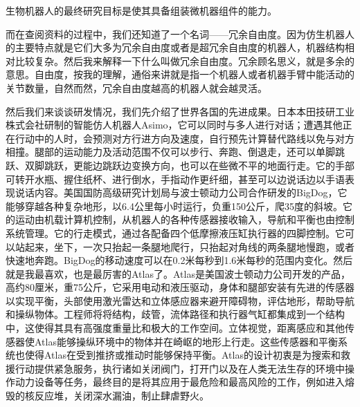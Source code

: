 \documentclass{article}
\begin{document}
\begin{itemize}
    生物机器人的最终研究目标是使其具备组装微机器组件的能力。\par
    而在查阅资料的过程中，我们还知道了一个名词——冗余自由度。因为仿生机器人的主要特点就是它们大多为冗余自由度或者是超冗余自由度的机器人，机器结构相对比较复杂。然后我来解释一下什么叫做冗余自由度。冗余顾名思义，就是多余的意思。自由度，按我的理解，通俗来讲就是指一个机器人或者机器手臂中能活动的关节数量，自然而然，冗余自由度越高的机器人就会越灵活。\par
    然后我们来谈谈研发情况，我们先介绍了世界各国的先进成果。日本本田技研工业株式会社研制的智能仿人机器人Asimo，它可以同时与多人进行对话；遭遇其他正在行动中的人时，会预测对方行进方向及速度，自行预先计算替代路线以免与对方相撞。腿部的运动能力及活动范围不仅可以步行、奔跑、倒退走，还可以单脚跳跃、双脚跳跃，更能边跳跃边变换方向，也可以在些微不平的地面行走。它的手部可转开水瓶、握住纸杯、进行倒水，手指动作更纤细，甚至可以边说话边以手语表现说话内容。美国国防高级研究计划局与波士顿动力公司合作研发的BigDog，它能够穿越各种复杂地形，以6.4公里每小时运行，负重150公斤，爬35度的斜坡。它的运动由机载计算机控制，从机器人的各种传感器接收输入，导航和平衡也由控制系统管理。它的行走模式，通过各配备四个低摩擦液压缸执行器的四脚控制。它可以站起来，坐下，一次只抬起一条腿地爬行，只抬起对角线的两条腿地慢跑，或者快速地奔跑。BigDog的移动速度可以在0.2米每秒到1.6米每秒的范围内变化。然后就是我最喜欢，也是最厉害的Atlas了。Atlas是美国波士顿动力公司开发的产品，高约80厘米，重75公斤，它采用电动和液压驱动，身体和腿部安装有先进的传感器以实现平衡，头部使用激光雷达和立体感应器来避开障碍物，评估地形，帮助导航和操纵物体。工程师将将结构，歧管，流体路径和执行器气缸都集成到一个结构中，这使得其具有高强度重量比和极大的工作空间。立体视觉，距离感应和其他传感器使Atlas能够操纵环境中的物体并在崎岖的地形上行走。这些传感器和平衡系统也使得Atlas在受到推挤或推动时能够保持平衡。Atlas的设计初衷是为搜索和救援行动提供紧急服务，执行诸如关闭阀门，打开门以及在人类无法生存的环境中操作动力设备等任务，最终目的是将其应用于最危险和最高风险的工作，例如进入熔毁的核反应堆，关闭深水漏油，制止肆虐野火。

\end{itemize}
\end{document}

